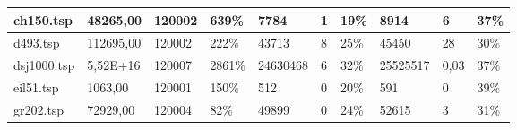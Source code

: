 \begin{table}[H]
\begin{tabular}{|l|l|l|l|l|l|l|l|l|l|}
{\color[HTML]{000000} ch150.tsp}                                                                        & {\color[HTML]{000000} 48265,00}                  & {\color[HTML]{000000} 120002}             & {\color[HTML]{000000} 639\%}                & {\color[HTML]{000000} 7784}                      & {\color[HTML]{000000} 1}                  & {\color[HTML]{000000} 19\%}                 & {\color[HTML]{000000} 8914}                      & {\color[HTML]{000000} 6}                  & {\color[HTML]{000000} 37\%}                 \\ \hline
\rowcolor[HTML]{EFEFEF} 
{\color[HTML]{000000} d493.tsp}                                                                         & {\color[HTML]{000000} 112695,00}                 & {\color[HTML]{000000} 120002}             & {\color[HTML]{000000} 222\%}                & {\color[HTML]{000000} 43713}                     & {\color[HTML]{000000} 8}                  & {\color[HTML]{000000} 25\%}                 & {\color[HTML]{000000} 45450}                     & {\color[HTML]{000000} 28}                 & {\color[HTML]{000000} 30\%}                 \\ \hline
{\color[HTML]{000000} dsj1000.tsp}                                                                      & {\color[HTML]{000000} 5,52E+16}                  & {\color[HTML]{000000} 120007}             & {\color[HTML]{000000} 2861\%}               & {\color[HTML]{000000} 24630468}                  & {\color[HTML]{000000} 6}                  & {\color[HTML]{000000} 32\%}                 & {\color[HTML]{000000} 25525517}                  & {\color[HTML]{000000} 0,03}               & {\color[HTML]{000000} 37\%}                 \\ \hline
\rowcolor[HTML]{EFEFEF} 
{\color[HTML]{000000} eil51.tsp}                                                                        & {\color[HTML]{000000} 1063,00}                   & {\color[HTML]{000000} 120001}             & {\color[HTML]{000000} 150\%}                & {\color[HTML]{000000} 512}                       & {\color[HTML]{000000} 0}                  & {\color[HTML]{000000} 20\%}                 & {\color[HTML]{000000} 591}                       & {\color[HTML]{000000} 0}                  & {\color[HTML]{000000} 39\%}                 \\ \hline
{\color[HTML]{000000} gr202.tsp}                                                                        & {\color[HTML]{000000} 72929,00}                  & {\color[HTML]{000000} 120004}             & {\color[HTML]{000000} 82\%}                 & {\color[HTML]{000000} 49899}                     & {\color[HTML]{000000} 0}                  & {\color[HTML]{000000} 24\%}                 & {\color[HTML]{000000} 52615}                     & {\color[HTML]{000000} 3}                  & {\color[HTML]{000000} 31\%}                 \\ \hline

\end{tabular}
\end{table}
